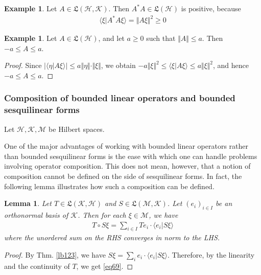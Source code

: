 \documentclass[12pt,b5paper,notitlepage]{article}
\theoremstyle{definition}
\newtheorem{eg}[df]{Example}
\theoremstyle{plain}
\newtheorem{lm}[df]{Lemma}
\newcommand{\fk}{\mathfrak}
\newcommand{\bk}[1]{\langle {#1}\rangle}
\newcommand{\MH}{\mathcal H}
\newcommand{\MK}{\mathcal K}
\newcommand{\MM}{\mathcal M}
\numberwithin{equation}{section}
\begin{document}
\begin{eg}
Let $A\in\fk L(\MH,\MK)$. Then $A^*A\in\fk L(\MH)$ is positive, because
\begin{align*}
\bk{\xi|A^*A\xi}=\Vert A\xi\Vert^2\geq0
\end{align*}
\end{eg}

\begin{eg}\label{lb201}
Let $A\in\fk L(\MH)$, and let $a\geq0$ such that $\Vert A\Vert\leq a$. Then $-a\leq A\leq a$.
\end{eg}

\begin{proof}
Since $|\bk{\eta|A\xi}|\leq a\Vert\eta\Vert\cdot\Vert\xi\Vert$, we obtain $-a\Vert\xi\Vert^2\leq\bk{\xi|A\xi}\leq a\Vert\xi\Vert^2$, and hence $-a\leq A\leq a$. 
\end{proof}





\subsubsection{Composition of bounded linear operators and bounded sesquilinear forms}\label{lb152}


Let $\MH,\MK,\MM$ be Hilbert spaces.

One of the major advantages of working with bounded linear operators rather than bounded sesquilinear forms is the ease with which one can handle problems involving operator composition. This does not mean, however, that a notion of composition cannot be defined on the side of sesquilinear forms. In fact, the following lemma illustrates how such a composition can be defined.

\begin{lm}\label{lb138}
Let $T\in\fk L(\MK,\MH)$ and $S\in\fk L(\MM,\MK)$. Let $(e_i)_{i\in I}$ be an orthonormal basis of $\MK$. Then for each $\xi\in\MM$, we have
\begin{align}\label{eq69}
T\circ S\xi=\sum_{i\in I}Te_i\cdot\bk{e_i|S\xi}
\end{align}
where the unordered sum on the RHS converges in norm to the LHS.
\end{lm}

\begin{proof}
By Thm. \ref{lb123}, we have $S\xi=\sum_i e_i\cdot\bk{e_i|S\xi}$. Therefore, by the linearity and the continuity of $T$, we get \eqref{eq69}.
\end{proof}
\end{document}
